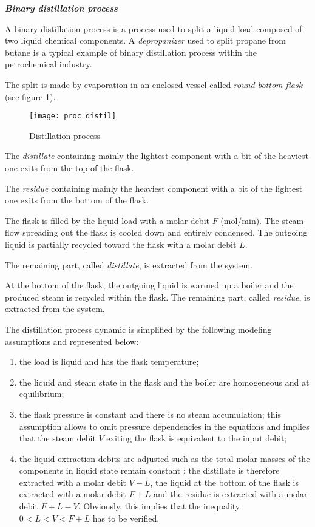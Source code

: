 \begin{exemple}{\bf \em Binary distillation process}

A binary distillation process is a process used to split a liquid load composed of two liquid chemical components.
A {\it depropanizer} used to split propane from butane is a typical example of binary distillation process within the petrochemical industry.

The split is made by evaporation in an enclosed vessel called {\em round-bottom flask} (see figure \ref{Fig:distillation}).
\begin{figure}[h]
\begin{center}
\texttt{[image: proc\_distil]}
\caption{Distillation process}
\label{Fig:distillation}
\end{center} 
\end{figure}
The {\it distillate} containing mainly the lightest component with a bit of the heaviest one exits from the top of the flask.

The {\it residue} containing mainly the heaviest component with a bit of the lightest one exits from the bottom of the flask.

The flask is filled by the liquid load with a molar debit $F$ (mol/min). 
The steam flow spreading out the flask is cooled down and entirely condensed.
The outgoing liquid is partially recycled toward the flask with a molar debit $L$. 

The remaining part, called {\it distillate}, is extracted from the system.

At the bottom of the flask, the outgoing liquid is warmed up a boiler and the produced steam is recycled within the flask.
The remaining part, called {\it residue}, is extracted from the system.

The distillation process dynamic is simplified by the following modeling assumptions and represented below:
\begin{enumerate}
\item the load is liquid and has the flask temperature;
\item the liquid and steam state in the flask and the boiler are homogeneous and at equilibrium;
\item the flask pressure is constant and there is no steam accumulation; this assumption allows to omit pressure dependencies
in the equations and implies that the steam debit $V$  exiting the flask is equivalent to the input debit; 
\item the liquid extraction debits are adjusted such as the total molar masses of the components in liquid state remain constant : 
the distillate is therefore extracted with a molar debit $V-L$, the liquid at the bottom of the flask is extracted with a molar debit $F+L$
and the residue is extracted with a molar debit $F+L-V$. Obviously, this implies that the inequality $0 < L < V < F+L$ has to be verified.\\
\end{enumerate}


\end{exemple}
